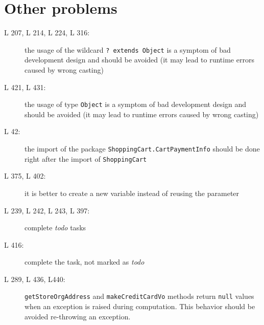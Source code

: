 \section{Other problems}
\begin{description}
	\item[L 207, L 214, L 224, L 316:] the usage of the wildcard {\tt ? extends Object} is a symptom of bad development design and should be avoided (it may lead to runtime errors caused by wrong casting)
	\item[L 421, L 431:] the usage of type {\tt Object} is a symptom of bad development design and should be avoided (it may lead to runtime errors caused by wrong casting)
	\item[L 42:] the import of the package {\tt ShoppingCart.CartPaymentInfo} should be done right after the import of {\tt ShoppingCart}
	\item[L 375, L 402:] it is better to create a new variable instead of reusing the parameter
	\item[L 239, L 242, L 243, L 397:]  complete \emph{todo} tasks
	\item[L 416:] complete the task, not marked as \emph{todo}
	\item[L 289, L 436, L440:] {\tt getStoreOrgAddress} and {\tt makeCreditCardVo} methods return {\tt null} values when an exception is raised during computation. This behavior should be avoided re-throwing an exception.
\end{description}